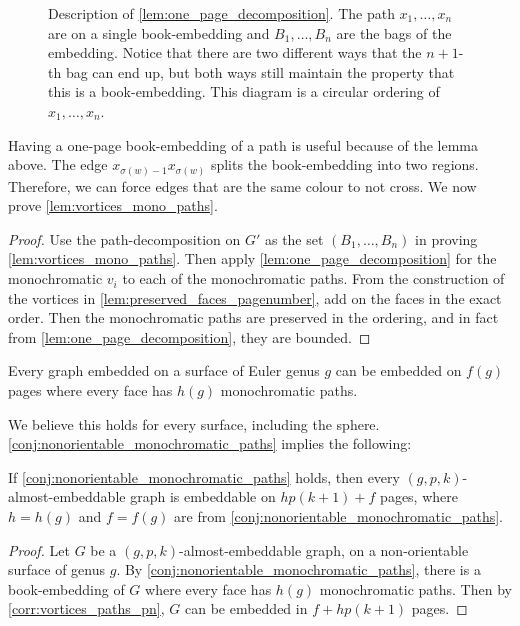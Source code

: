 \begin{figure}[h!]
	\centering
	
	\caption[One-page decomposition]{Description of \cref{lem:one_page_decomposition}. The path \(x_1, \ldots, x_n\) are on a single book-embedding and \(B_1, \ldots, B_n\) are the bags of the embedding. Notice that there are two different ways that the \(n + 1\)-th bag can end up, but both ways still maintain the property that this is a book-embedding. This diagram is a circular ordering of \(x_1, \ldots, x_n\).}\label{fig:preserving_pages}
\end{figure}
Having a one-page book-embedding of a path is useful because of the lemma above. The edge $x_{\sigma(w)-1} x_{\sigma(w)}$ splits the book-embedding into two regions. Therefore, we can force edges that are the same colour to not cross. 
We now prove \cref{lem:vortices_mono_paths}.
\begin{proof}
	Use the path-decomposition on \(G'\) as the set \((B_1, \ldots , B_n)\) in proving \cref{lem:vortices_mono_paths}. Then apply \cref{lem:one_page_decomposition} for the monochromatic \(v_i\) to each of the monochromatic paths. From the construction of the vortices in \cref{lem:preserved_faces_pagenumber}, add on the faces in the exact order. Then the monochromatic paths are preserved in the ordering, and in fact from \cref{lem:one_page_decomposition}, they are bounded.
\end{proof}

\begin{conjecture}\label{conj:nonorientable_monochromatic_paths}
	Every graph embedded on a surface of Euler genus $g$ can be embedded on $f(g)$ pages where every face has $h(g)$ monochromatic paths. 
\end{conjecture}
We believe this holds for every surface, including the sphere.
\cref{conj:nonorientable_monochromatic_paths} implies the following:

\begin{corollary}\label{corr:aegraphs}
	If \cref{conj:nonorientable_monochromatic_paths} holds, then every $(g, p, k)$-almost-embeddable graph is embeddable on $h p (k + 1) + f$ pages, where $h = h(g)$ and $f = f(g)$ are from \cref{conj:nonorientable_monochromatic_paths}.
\end{corollary}

\begin{proof}
	Let $G$ be a $(g, p, k)$-almost-embeddable graph, on a non-orientable surface of genus $g$. By \cref{conj:nonorientable_monochromatic_paths}, there is a book-embedding of $G$ where every face has $h(g)$ monochromatic paths. Then by \cref{corr:vortices_paths_pn}, $G$ can be embedded in $f + h p (k+1)$ pages. 
\end{proof}

